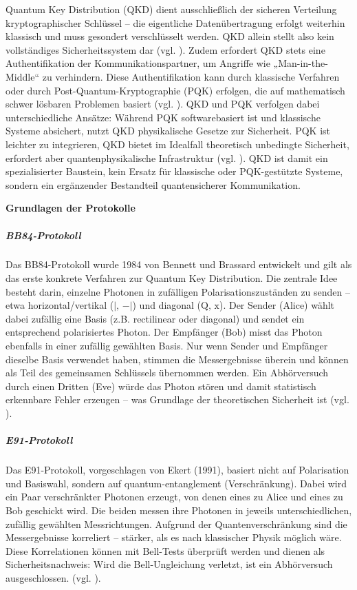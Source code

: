 Quantum Key Distribution (QKD) dient ausschließlich der sicheren Verteilung kryptographischer Schlüssel – die eigentliche Datenübertragung erfolgt weiterhin klassisch und muss gesondert verschlüsselt werden. QKD allein stellt also kein vollständiges Sicherheitssystem dar (vgl. \cite{scarani_et_al_security_2009}).
Zudem erfordert QKD stets eine Authentifikation der Kommunikationspartner, um Angriffe wie „Man-in-the-Middle“ zu verhindern. Diese Authentifikation kann durch klassische Verfahren oder durch Post-Quantum-Kryptographie (PQK) erfolgen, die auf mathematisch schwer lösbaren Problemen basiert (vgl. \cite{mosca_et_al_cybersecurity_2018}).
QKD und PQK verfolgen dabei unterschiedliche Ansätze: Während PQK softwarebasiert ist und klassische Systeme absichert, nutzt QKD physikalische Gesetze zur Sicherheit. PQK ist leichter zu integrieren, QKD bietet im Idealfall theoretisch unbedingte Sicherheit, erfordert aber quantenphysikalische Infrastruktur (vgl. \cite{national_academies_of_sciences_quantum_2019}).
QKD ist damit ein spezialisierter Baustein, kein Ersatz für klassische oder PQK-gestützte Systeme, sondern ein ergänzender Bestandteil quantensicherer Kommunikation.


\vspace{1em}
\textbf{Grundlagen der Protokolle}

\subparagraph{BB84-Protokoll}
Das BB84-Protokoll wurde 1984 von Bennett und Brassard entwickelt und gilt als das erste konkrete Verfahren zur Quantum Key Distribution. 
Die zentrale Idee besteht darin, einzelne Photonen in zufälligen Polarisationszuständen zu senden – etwa horizontal/vertikal ($\lvert,\,-\rvert$) 
und diagonal ($\mathrm{Q},\,\mathrm{x}$).
Der Sender (Alice) wählt dabei zufällig eine Basis (z.B. rectilinear oder diagonal) und sendet ein entsprechend polarisiertes Photon. Der Empfänger (Bob) misst das Photon ebenfalls in einer zufällig gewählten Basis. Nur wenn Sender und Empfänger dieselbe Basis verwendet haben, stimmen die Messergebnisse überein und können als Teil des gemeinsamen Schlüssels übernommen werden.
Ein Abhörversuch durch einen Dritten (Eve) würde das Photon stören und damit statistisch erkennbare Fehler erzeugen – was Grundlage der theoretischen Sicherheit ist (vgl. \cite{bennett_et_al_quantum_1984}).
 
\subparagraph{E91-Protokoll}
Das E91-Protokoll, vorgeschlagen von Ekert (1991), basiert nicht auf Polarisation und Basiswahl, sondern auf quantum-entanglement (Verschränkung). Dabei wird ein Paar verschränkter Photonen erzeugt, von denen eines zu Alice und eines zu Bob geschickt wird.
Die beiden messen ihre Photonen in jeweils unterschiedlichen, zufällig gewählten Messrichtungen. Aufgrund der Quantenverschränkung sind die Messergebnisse korreliert – stärker, als es nach klassischer Physik möglich wäre. Diese Korrelationen können mit Bell-Tests überprüft werden und dienen als Sicherheitsnachweis: Wird die Bell-Ungleichung verletzt, ist ein Abhörversuch ausgeschlossen. (vgl. \cite{ekert_et_al_quantum_1991}).

